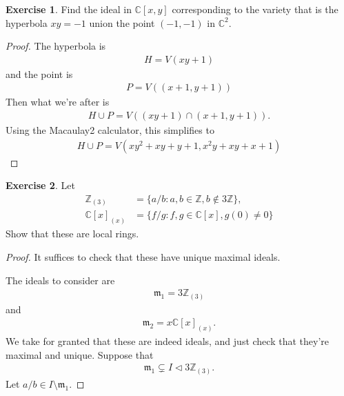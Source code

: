 \documentclass[12pt]{extarticle}
\newcommand{\set}[1]{\{#1\}}
\newcommand{\C}{\mathbb{C}}
\newcommand{\Z}{\mathbb{Z}}
\newcommand{\<}{\langle}
\renewcommand{\>}{\rangle}
\theoremstyle{definition}
\newtheorem{exercise}{Exercise}
\begin{document}
\begin{exercise}
  Find the ideal in $\C[x,y]$ corresponding to the variety that is the hyperbola $xy=-1$ union the point $(-1,-1)$ in $\C^2$.
\end{exercise}
\begin{proof}
  The hyperbola is 
  \begin{align*}
    H = V(xy+1)
  \end{align*}
  and the point is
  \begin{align*}
    P = V((x+1,y+1))
  \end{align*}
  Then what we're after is
  \begin{align*}
    H \cup P = V((xy+1) \cap (x+1,y+1)).
  \end{align*}
  Using the Macaulay2 calculator, this simplifies to
  \begin{align*}
    H \cup P = V(xy^2 + xy + y + 1, x^2y + xy + x + 1)
  \end{align*}
\end{proof}
\begin{exercise}
  Let
  \begin{align*}
    \Z_{(3)} &= \set{a/b: a,b \in \Z, b \not \in 3\Z}, \\
    \C[x]_{(x)} &= \set{f/g: f,g \in \C[x], g(0) \neq 0}
  \end{align*}
  Show that these are local rings.
\end{exercise}

\begin{proof}
  It suffices to check that these have unique maximal ideals.

  The ideals to consider are 
  \begin{align*}
    \mathfrak{m}_1 = 3\Z_{(3)}
  \end{align*}
  and 
  \begin{align*}
    \mathfrak{m}_2 = x \C[x]_{(x)}.
  \end{align*}
  We take for granted that these are indeed ideals, and just check that they're maximal and unique. Suppose that
  \begin{align*}
    \mathfrak{m}_1 \subsetneq I \triangleleft 3 \Z_{(3)}.
  \end{align*}
  Let $a/b \in I \setminus \mathfrak{m}_1$.
\end{proof}
\end{document}
